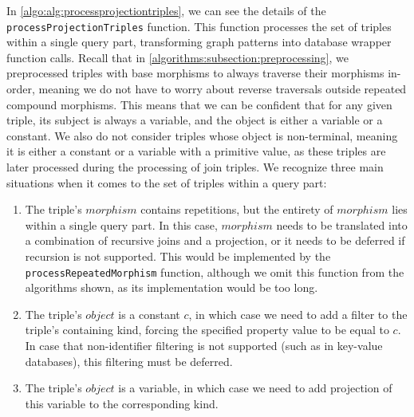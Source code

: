 In \cref{algo:alg:processprojectiontriples}, we can see the details of the \texttt{processProjectionTriples} function.
This function processes the set of triples within a single query part, transforming graph patterns into database wrapper function calls.
Recall that in \cref{algorithms:subsection:preprocessing}, we preprocessed triples with base morphisms to always traverse their morphisms in-order, meaning we do not have to worry about reverse traversals outside repeated compound morphisms.
This means that we can be confident that for any given triple, its subject is always a variable, and the object is either a variable or a constant.
We also do not consider triples whose object is non-terminal, meaning it is either a constant or a variable with a primitive value, as these triples are later processed during the processing of join triples.
We recognize three main situations when it comes to the set of triples within a query part:

\begin{enumerate}
    \item The triple's $morphism$ contains repetitions, but the entirety of $morphism$ lies within a single query part. In this case, $morphism$ needs to be translated into a combination of recursive joins and a projection, or it needs to be deferred if recursion is not supported. This would be implemented by the \texttt{processRepeatedMorphism} function, although we omit this function from the algorithms shown, as its implementation would be too long.
    \item The triple's $object$ is a constant $c$, in which case we need to add a filter to the triple's containing kind, forcing the specified property value to be equal to $c$. In case that non-identifier filtering is not supported (such as in key-value databases), this filtering must be deferred.
    \item The triple's $object$ is a variable, in which case we need to add projection of this variable to the corresponding kind.
\end{enumerate}

